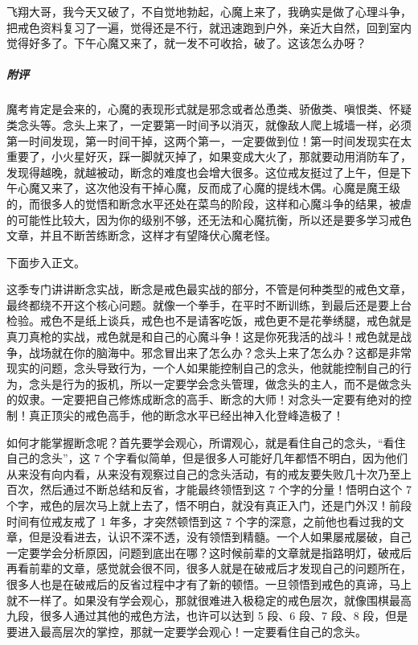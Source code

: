 \begin{case}
    飞翔大哥，我今天又破了，不自觉地勃起，心魔上来了，我确实是做了心理斗争，把戒色资料复习了一遍，觉得还是不行，就迅速跑到户外，亲近大自然，回到室内觉得好多了。下午心魔又来了，就一发不可收拾，破了。这该怎么办呀？
    \subparagraph{附评} 魔考肯定是会来的，心魔的表现形式就是邪念或者怂恿类、骄傲类、嗔恨类、怀疑类念头等。念头上来了，一定要第一时间予以消灭，就像敌人爬上城墙一样，必须第一时间发现，第一时间干掉，这两个第一，一定要做到位！第一时间发现实在太重要了，小火星好灭，踩一脚就灭掉了，如果变成大火了，那就要动用消防车了，发现得越晚，就越被动，断念的难度也会增大很多。这位戒友挺过了上午，但是下午心魔又来了，这次他没有干掉心魔，反而成了心魔的提线木偶。心魔是魔王级的，而很多人的觉悟和断念水平还处在菜鸟的阶段，这样和心魔斗争的结果，被虐的可能性比较大，因为你的级别不够，还无法和心魔抗衡，所以还是要多学习戒色文章，并且不断苦练断念，这样才有望降伏心魔老怪。
\end{case}

下面步入正文。

这季专门讲讲断念实战，断念是戒色最实战的部分，不管是何种类型的戒色文章，最终都绕不开这个核心问题。就像一个拳手，在平时不断训练，到最后还是要上台检验。戒色不是纸上谈兵，戒色也不是请客吃饭，戒色更不是花拳绣腿，戒色就是真刀真枪的实战，戒色就是和自己的心魔斗争！这是你死我活的战斗！戒色就是战争，战场就在你的脑海中。邪念冒出来了怎么办？念头上来了怎么办？这都是非常现实的问题，念头导致行为，一个人如果能控制自己的念头，他就能控制自己的行为，念头是行为的扳机，所以一定要学会念头管理，做念头的主人，而不是做念头的奴隶。一定要把自己修炼成断念的高手、断念的大师！对念头一定要有绝对的控制！真正顶尖的戒色高手，他的断念水平已经出神入化登峰造极了！

如何才能掌握断念呢？首先要学会观心，所谓观心，就是看住自己的念头，“看住自己的念头”，这 7 个字看似简单，但是很多人可能好几年都悟不明白，因为他们从来没有向内看，从来没有观察过自己的念头活动，有的戒友要失败几十次乃至上百次，然后通过不断总结和反省，才能最终领悟到这 7 个字的分量！悟明白这个 7 个字，戒色的层次马上就上去了，悟不明白，就没有真正入门，还是门外汉！前段时间有位戒友戒了 1 年多，才突然顿悟到这 7 个字的深意，之前他也看过我的文章，但是没看进去，认识不深不透，没有领悟到精髓。一个人如果屡戒屡破，自己一定要学会分析原因，问题到底出在哪？这时候前辈的文章就是指路明灯，破戒后再看前辈的文章，感觉就会很不同，很多人就是在破戒后才发现自己的问题所在，很多人也是在破戒后的反省过程中才有了新的顿悟。一旦领悟到戒色的真谛，马上就不一样了。如果没有学会观心，那就很难进入极稳定的戒色层次，就像围棋最高九段，很多人通过其他的戒色方法，也许可以达到 5 段、6 段、7 段、8 段，但是要进入最高层次的掌控，那就一定要学会观心！一定要看住自己的念头。

